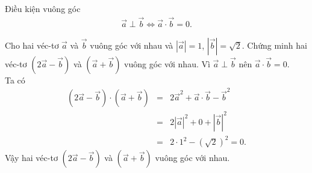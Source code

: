 \begin{dang}{Điều kiện vuông góc}
		\begin{eqnarray*}
			\overrightarrow{a}\perp\overrightarrow{b}\Leftrightarrow \overrightarrow{a}\cdot\overrightarrow{b}=0.
		\end{eqnarray*}
\end{dang}
\viduminhhoa
\begin{vd}%
	Cho hai véc-tơ $\overrightarrow{a}$ và $\overrightarrow{b}$ vuông góc với nhau và $\left |\overrightarrow{a} \right |=1$, $\left |\overrightarrow{b} \right |=\sqrt{2}$. Chứng minh hai véc-tơ $\left (2\overrightarrow{a}-\overrightarrow{b} \right )$ và $\left (\overrightarrow{a}+\overrightarrow{b} \right )$ vuông góc với nhau.
	\loigiai
	{
		Vì $\overrightarrow{a}\perp\overrightarrow{b}$ nên $\overrightarrow{a}\cdot\overrightarrow{b}=0$.\\
		Ta có
		\begin{eqnarray*}
			\left (2\overrightarrow{a}-\overrightarrow{b} \right )\cdot \left (\overrightarrow{a}+\overrightarrow{b} \right )&=&2\overrightarrow{a}^2+\overrightarrow{a}\cdot\overrightarrow{b}-\overrightarrow{b}^2\\&=&2\left |\overrightarrow{a} \right |^2+0+\left |\overrightarrow{b} \right |^2\\&=&2\cdot 1^2-\left (\sqrt{2} \right )^2=0.
		\end{eqnarray*}
		Vậy hai véc-tơ $\left (2\overrightarrow{a}-\overrightarrow{b} \right )$ và $\left (\overrightarrow{a}+\overrightarrow{b} \right )$ vuông góc với nhau.
	}
\end{vd}

